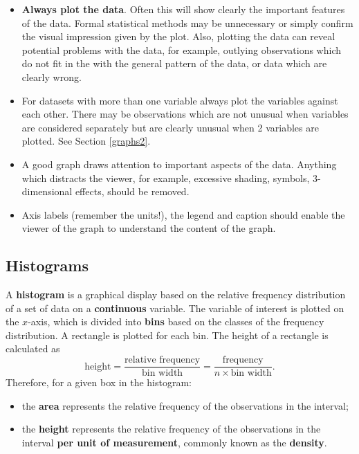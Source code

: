 \documentclass[
  british,
]{book}
\providecommand{\tightlist}{%
  \setlength{\itemsep}{0pt}\setlength{\parskip}{0pt}}
\begin{document}
\begin{itemize}
\tightlist
\item
  \textbf{Always plot the data}. Often this will show clearly the important features of the data. Formal statistical methods may be unnecessary or simply confirm the visual impression given by the plot. Also, plotting the data can reveal potential problems with the data, for example, outlying observations which do not fit in the with the general pattern of the data, or data which are clearly wrong.
\item
  For datasets with more than one variable always plot the variables against
  each other. There may be observations which are not unusual when variables are considered separately but are clearly unusual when 2 variables are plotted. See Section \ref{graphs2}.
\item
  A good graph draws attention to important aspects of the data. Anything which distracts the viewer, for example, excessive shading, symbols, 3-dimensional effects, should be removed.\\
\item
  Axis labels (remember the units!), the legend and caption should enable the viewer of the graph to understand the content of the graph.
\end{itemize}

\hypertarget{histogram}{%
\subsection{Histograms}\label{histogram}}

A \textbf{histogram} is a graphical display based on the relative frequency distribution of a set of data on a \textbf{continuous} variable. The variable of interest is plotted on the \(x\)-axis, which is divided into \textbf{bins} based on the classes of the frequency distribution. A rectangle is plotted for each bin. The height of a rectangle is calculated as
\begin{equation}
\mbox{height} = \frac{\mbox{relative frequency}}{\mbox{bin width}} = \frac{\mbox{frequency}}{n \times \mbox{bin width}}.
\label{eq:hist}
\end{equation}
Therefore, for a given box in the histogram:

\begin{itemize}
\tightlist
\item
  the \textbf{area} represents the relative frequency of the observations in
  the interval;
\item
  the \textbf{height} represents the relative frequency of the observations in
  the interval \textbf{per unit of measurement}, commonly known as the \textbf{density}.
\end{itemize}
\end{document}
